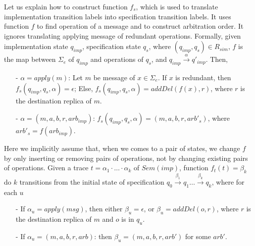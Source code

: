 Let us explain how to construct function $f_s$, which is used to translate implementation transition labels into specification transition labels. It uses function $f$ to find operation of a message and to construct arbitration order. It ignores translating applying message of redundant operations. Formally, given implementation state $q_{\mathit{imp}}$, specification state $q_s$, where $(q_{\mathit{imp}},q_s) \in R_{\mathit{sim}}$, $f$ is the map between $\Sigma_e$ of $q_{\mathit{imp}}$ and operations of $q_s$, and $q_{\mathit{imp}} {\xrightarrow{\alpha}} q'_{\mathit{imp}}$. Then,

\begin{itemize}
\setlength{\itemsep}{0.5pt}
\item[-] $\alpha = apply(m)$: Let $m$ be message of $x \in \Sigma_e$. If $x$ is redundant, then $f_s(q_{\mathit{imp}},q_s,\alpha) = \epsilon$; Else, $f_s(q_{\mathit{imp}},q_s,\alpha) = addDel(f(x),r)$, where $r$ is the destination replica of $m$.

\item[-] $\alpha = (m,a,b,r,\mathit{arb}_{\mathit{imp}})$: $f_s(q_{\mathit{imp}},q_s,\alpha) = (m,a,b,r,\mathit{arb}'_s)$, where $\mathit{arb}'_s = f( \mathit{arb}_{\mathit{imp}} )$. 
\end{itemize}

Here we implicitly assume that, when we comes to a pair of states, we change $f$ by only inserting or removing pairs of operations, not by changing existing pairs of operations. Given a trace $t = \alpha_1 \cdot \ldots \cdot \alpha_k$ of $\mathit{Sem}(\mathit{imp})$, function $f_t(t) = \beta_k$ do $k$ transitions from the initial state of specification $q_0 {\xrightarrow{\beta_1}} q_1 \ldots {\xrightarrow{\beta_k}} q_k$, where for each $u$

\begin{itemize}
\setlength{\itemsep}{0.5pt}
\item[-] If $\alpha_u = \mathit{apply}(\mathit{msg})$, then either $\beta_u = \epsilon$, or $\beta_u = \mathit{addDel}(o,r)$, where $r$ is the destination replica of $\mathit{m}$ and $o$ is in $q_u$.   

\item[-] If $\alpha_u = (m,a,b,r,\mathit{arb})$: then $\beta_u =  (m,a,b,r,\mathit{arb}')$ for some $\mathit{arb}'$. 
\end{itemize}





